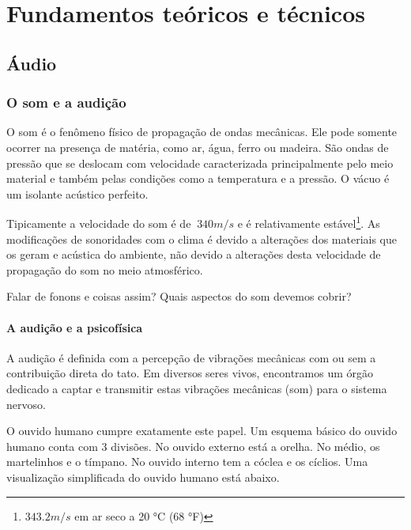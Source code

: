 \chapter{Fundamentos teóricos e técnicos} %

\section{Áudio}

  \subsection{O som e a audição}

O som é o fenômeno físico de propagação de ondas mecânicas. Ele pode
somente ocorrer na presença de matéria, como ar, água, ferro ou madeira.
São ondas de pressão que se deslocam com velocidade caracterizada principalmente
pelo meio material e também pelas condições como a temperatura e a pressão.
O vácuo é um isolante acústico perfeito.

Tipicamente a velocidade do som é de $~340 m/s $ e é
relativamente estável\footnote{$343.2 m/s$ em ar seco a 20 °C (68 °F)}.
As modificações de sonoridades com o clima é devido a alterações
dos materiais que os geram e acústica do ambiente, não devido a alterações
desta velocidade de propagação do som no meio atmosférico.

Falar de fonons e coisas assim? Quais aspectos do som devemos cobrir?

      \subsubsection{A audição e a psicofísica}

A audição é definida com a percepção de vibrações mecânicas com
ou sem a contribuição direta do tato. Em diversos
seres vivos, encontramos um órgão dedicado a captar e transmitir
estas vibrações mecânicas (som) para o sistema nervoso.

O ouvido humano cumpre exatamente este papel. Um esquema básico
do ouvido humano conta com 3 divisões. No ouvido externo está a orelha.
No médio, os martelinhos e o tímpano. No ouvido interno tem a cóclea
e os cíclios. Uma visualização simplificada do ouvido humano está abaixo.


